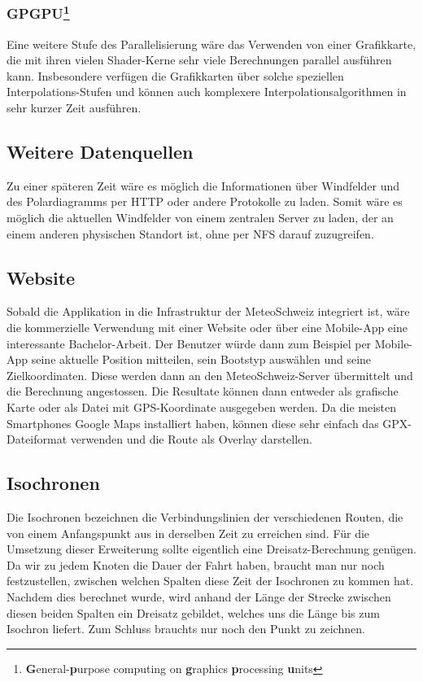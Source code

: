 \subsubsection{GPGPU\protect\footnote{\textbf{G}eneral-\textbf{p}urpose computing on \textbf{g}raphics \textbf{p}rocessing \textbf{u}nits}}
Eine weitere Stufe des Parallelisierung wäre das Verwenden von einer
Grafikkarte, die mit ihren vielen Shader-Kerne sehr viele Berechnungen
parallel ausführen kann. Insbesondere verfügen die Grafikkarten über solche
speziellen Interpolations-Stufen und können auch komplexere
Interpolationsalgorithmen in sehr kurzer Zeit ausführen.
 
\subsection{Weitere Datenquellen}
Zu einer späteren Zeit wäre es möglich die Informationen über Windfelder und
des Polardiagramms per HTTP oder andere Protokolle zu laden. Somit wäre es
möglich die aktuellen Windfelder von einem zentralen Server zu laden, der an
einem anderen physischen Standort ist, ohne per NFS darauf zuzugreifen.

\subsection{Website}
Sobald die Applikation in die Infrastruktur der MeteoSchweiz integriert ist,
wäre die kommerzielle Verwendung mit einer Website oder über eine Mobile-App
eine interessante Bachelor-Arbeit. Der Benutzer würde dann zum Beispiel per
Mobile-App seine aktuelle Position mitteilen, sein Bootstyp auswählen und
seine Zielkoordinaten. Diese werden dann an den MeteoSchweiz-Server
übermittelt und die Berechnung angestossen. Die Resultate können dann entweder
als grafische Karte oder als Datei mit GPS-Koordinate ausgegeben werden. Da
die meisten Smartphones Google Maps installiert haben, können diese sehr
einfach das GPX-Dateiformat verwenden und die Route als Overlay darstellen.

\subsection{Isochronen}
Die Isochronen bezeichnen die Verbindungslinien der verschiedenen Routen, die
von einem Anfangspunkt aus in derselben Zeit zu erreichen sind.  Für die
Umsetzung dieser Erweiterung sollte eigentlich eine Dreisatz-Berechnung
genügen. Da wir zu jedem Knoten die Dauer der Fahrt haben, braucht man nur
noch festzustellen, zwischen welchen Spalten diese Zeit der Isochronen zu
kommen hat. Nachdem dies berechnet wurde, wird anhand der Länge der Strecke
zwischen diesen beiden Spalten ein Dreisatz gebildet, welches uns die Länge
bis zum Isochron liefert. Zum Schluss brauchts nur noch den Punkt zu zeichnen.

